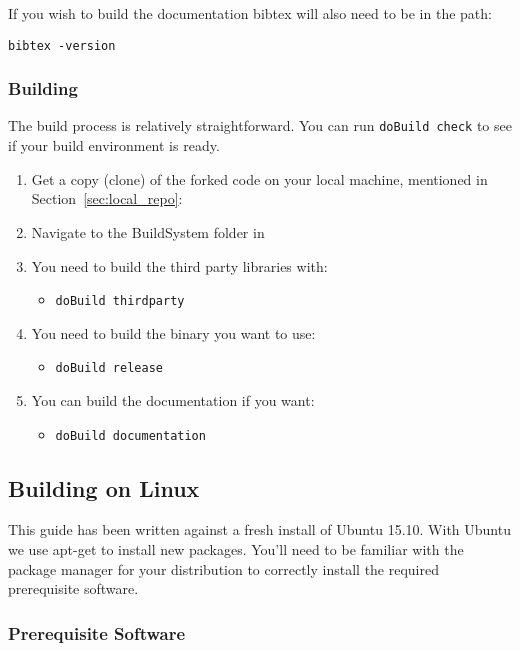 If you wish to build the documentation bibtex will also need to be in the path:

\texttt{bibtex -version}

\subsubsection{Building \CNAME}

The build process is relatively straightforward. You can run \texttt{doBuild check} to see if your build environment is ready.

\begin{enumerate}
  \item Get a copy (clone) of the forked code on your local machine, mentioned in Section~\ref{sec:local_repo}: 
  \item Navigate to the BuildSystem folder in 
  \item You need to build the third party libraries with:
  \begin{itemize}
    \item \texttt{doBuild thirdparty}
  \end{itemize}
  \item You need to build the binary you want to use:
  \begin{itemize}
    \item \texttt{doBuild release}
  \end{itemize}	
  \item You can build the documentation if you want:
  \begin{itemize}
    \item \texttt{doBuild documentation}
  \end{itemize}		
\end{enumerate}

\subsection{Building on Linux}

This guide has been written against a fresh install of Ubuntu 15.10. With Ubuntu we use apt-get to install new packages. You’ll need to be familiar with the package manager for your distribution to correctly install the required prerequisite software.

\subsubsection{Prerequisite Software}

